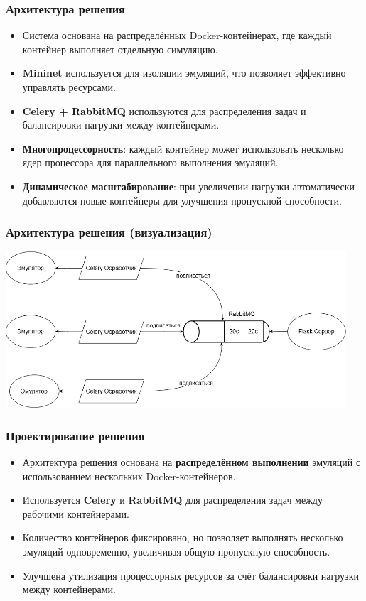 \documentclass{beamer}
\begin{document}
\begin{frame}[fragile]
  \frametitle{Архитектура решения}
  \begin{itemize}
    \item Система основана на распределённых Docker-контейнерах, где каждый контейнер выполняет отдельную симуляцию.
    \item \textbf{Mininet} используется для изоляции эмуляций, что позволяет эффективно управлять ресурсами.
    \item \textbf{Celery + RabbitMQ} используются для распределения задач и балансировки нагрузки между контейнерами.
    \item \textbf{Многопроцессорность}: каждый контейнер может использовать несколько ядер процессора для параллельного выполнения эмуляций.
    \item \textbf{Динамическое масштабирование}: при увеличении нагрузки автоматически добавляются новые контейнеры для улучшения пропускной способности.
  \end{itemize}
\end{frame}


\begin{frame}[fragile]
  \frametitle{Архитектура решения (визуализация)}
  \begin{center}
    \includegraphics[width=0.95\textwidth]{parallel.png}
  \end{center}
\end{frame}

\begin{frame}[fragile]
  \frametitle{Проектирование решения}
  \begin{itemize}
    \item Архитектура решения основана на \textbf{распределённом выполнении} эмуляций с использованием нескольких Docker-контейнеров.
    \item Используется \textbf{Celery} и \textbf{RabbitMQ} для распределения задач между рабочими контейнерами.
    \item Количество контейнеров фиксировано, но позволяет выполнять несколько эмуляций одновременно, увеличивая общую пропускную способность.
    \item Улучшена утилизация процессорных ресурсов за счёт балансировки нагрузки между контейнерами.
  \end{itemize}
\end{frame}
\end{document}
